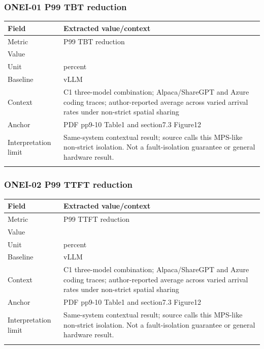 \subsubsection*{ONEI-01 P99 TBT reduction}
\begin{longtable}{>{\raggedright\arraybackslash}p{}>{\raggedright\arraybackslash}p{}}
\toprule
\textbf{Field} & \textbf{Extracted value/context}\\\midrule\endhead
Metric & P99 TBT reduction\\\addlinespace
Value & 65.5\\\addlinespace
Unit & percent\\\addlinespace
Baseline & vLLM\\\addlinespace
Context & C1 three-model combination;\allowbreak{} Alpaca/ShareGPT and Azure coding traces;\allowbreak{} author-reported average across varied arrival rates under non-strict spatial sharing\\\addlinespace
Anchor & PDF pp9-10 Table1 and section7.3 Figure12\\\addlinespace
Interpretation limit & Same-system contextual result;\allowbreak{} source calls this MPS-like non-strict isolation. Not a fault-isolation guarantee or general hardware result.\\\addlinespace
\bottomrule\end{longtable}
\subsubsection*{ONEI-02 P99 TTFT reduction}
\begin{longtable}{>{\raggedright\arraybackslash}p{}>{\raggedright\arraybackslash}p{}}
\toprule
\textbf{Field} & \textbf{Extracted value/context}\\\midrule\endhead
Metric & P99 TTFT reduction\\\addlinespace
Value & 20.7\\\addlinespace
Unit & percent\\\addlinespace
Baseline & vLLM\\\addlinespace
Context & C1 three-model combination;\allowbreak{} Alpaca/ShareGPT and Azure coding traces;\allowbreak{} author-reported average across varied arrival rates under non-strict spatial sharing\\\addlinespace
Anchor & PDF pp9-10 Table1 and section7.3 Figure12\\\addlinespace
Interpretation limit & Same-system contextual result;\allowbreak{} source calls this MPS-like non-strict isolation. Not a fault-isolation guarantee or general hardware result.\\\addlinespace
\bottomrule\end{longtable}
